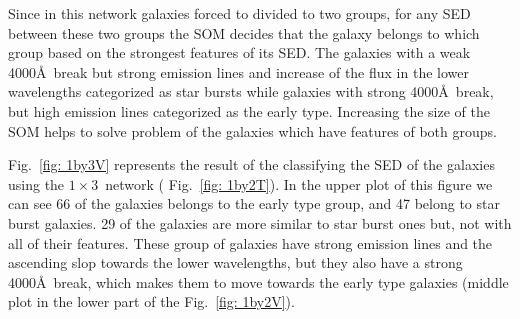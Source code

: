             Since in this network galaxies forced to divided to two groups, for any SED between these two groups the SOM decides that the galaxy belongs to which group based on the strongest features of its SED.
            The galaxies with a weak 4000\AA~break but strong emission lines and increase of the flux in the lower wavelengths categorized as star bursts while galaxies with strong 4000\AA~break, but high emission lines categorized as the early type.
            Increasing the size of the SOM helps to solve problem of the galaxies which have features of both groups.
            
             Fig.~\ref{fig: 1by3V} represents the result of the classifying the SED of the galaxies using the $1\times3$~network ( Fig.~\ref{fig: 1by2T}). 
             In the upper plot of this figure we can see 66 of the galaxies belongs to the early type group, and 47 belong to star burst galaxies. 
             29 of the galaxies are more similar to star burst ones but, not with all of their features. 
             These group of galaxies have strong emission lines and the ascending slop towards the lower wavelengths, but they also have a strong 4000\AA~break, which makes them to move towards the early type galaxies (middle plot in the lower part of the Fig.~\ref{fig: 1by2V}).

